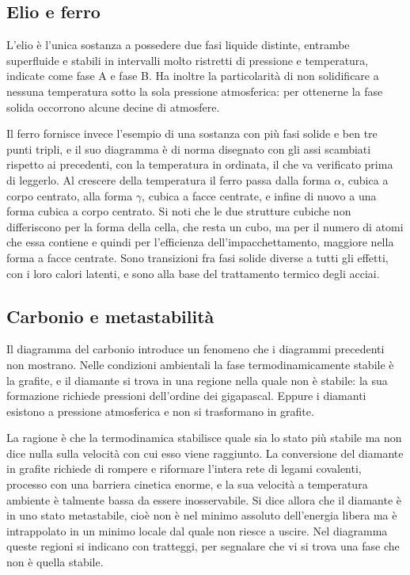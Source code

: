 \subsection{Elio e ferro}
 
L'elio è l'unica sostanza a possedere due fasi liquide distinte, entrambe superfluide e stabili in intervalli molto ristretti di pressione e temperatura, indicate come fase A e fase B.
Ha inoltre la particolarità di non solidificare a nessuna temperatura sotto la sola pressione atmosferica: per ottenerne la fase solida occorrono alcune decine di atmosfere.
 
Il ferro fornisce invece l'esempio di una sostanza con più fasi solide e ben tre punti tripli, e il suo diagramma è di norma disegnato con gli assi scambiati rispetto ai precedenti, con la temperatura in ordinata, il che va verificato prima di leggerlo.
Al crescere della temperatura il ferro passa dalla forma $\alpha$, cubica a corpo centrato, alla forma $\gamma$, cubica a facce centrate, e infine di nuovo a una forma cubica a corpo centrato.
Si noti che le due strutture cubiche non differiscono per la forma della cella, che resta un cubo, ma per il numero di atomi che essa contiene e quindi per l'efficienza dell'impacchettamento, maggiore nella forma a facce centrate.
Sono transizioni fra fasi solide diverse a tutti gli effetti, con i loro calori latenti, e sono alla base del trattamento termico degli acciai.
 
\subsection{Carbonio e metastabilità}
 
Il diagramma del carbonio introduce un fenomeno che i diagrammi precedenti non mostrano.
Nelle condizioni ambientali la fase termodinamicamente stabile è la grafite, e il diamante si trova in una regione nella quale non è stabile: la sua formazione richiede pressioni dell'ordine dei gigapascal.
Eppure i diamanti esistono a pressione atmosferica e non si trasformano in grafite.
 
La ragione è che la termodinamica stabilisce quale sia lo stato più stabile ma non dice nulla sulla velocità con cui esso viene raggiunto.
La conversione del diamante in grafite richiede di rompere e riformare l'intera rete di legami covalenti, processo con una barriera cinetica enorme, e la sua velocità a temperatura ambiente è talmente bassa da essere inosservabile.
Si dice allora che il diamante è in uno stato metastabile, cioè non è nel minimo assoluto dell'energia libera ma è intrappolato in un minimo locale dal quale non riesce a uscire.
Nel diagramma queste regioni si indicano con tratteggi, per segnalare che vi si trova una fase che non è quella stabile.